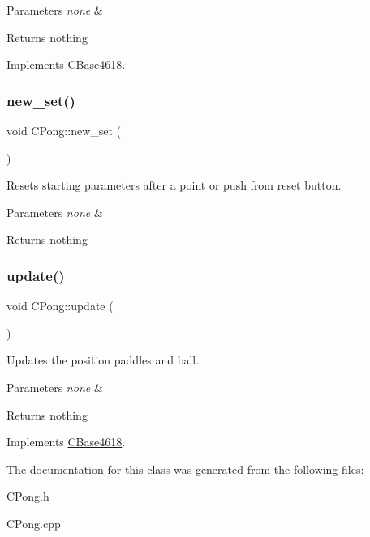 \begin{DoxyParams}{Parameters}
{\em none} & \\
\hline
\end{DoxyParams}
\begin{DoxyReturn}{Returns}
nothing 
\end{DoxyReturn}


Implements \hyperlink{class_c_base4618_a0987bf28e9beed4753d3628fcddc3315}{C\+Base4618}.

\hypertarget{class_c_pong_ab089f6ea43ba4fcfcea0a283606d5cff}{}\label{class_c_pong_ab089f6ea43ba4fcfcea0a283606d5cff} 
\subsubsection{\texorpdfstring{new\+\_\+set()}{new\_set()}}
{\footnotesize\ttfamily void C\+Pong\+::new\+\_\+set (\begin{DoxyParamCaption}{ }\end{DoxyParamCaption})\hspace{0.3cm}{\ttfamily [private]}}



Resets starting parameters after a point or push from reset button. 


\begin{DoxyParams}{Parameters}
{\em none} & \\
\hline
\end{DoxyParams}
\begin{DoxyReturn}{Returns}
nothing 
\end{DoxyReturn}
\hypertarget{class_c_pong_abdf0d44329b40d14863ba134b031435a}{}\label{class_c_pong_abdf0d44329b40d14863ba134b031435a} 
\subsubsection{\texorpdfstring{update()}{update()}}
{\footnotesize\ttfamily void C\+Pong\+::update (\begin{DoxyParamCaption}{ }\end{DoxyParamCaption})\hspace{0.3cm}{\ttfamily [virtual]}}



Updates the position paddles and ball. 


\begin{DoxyParams}{Parameters}
{\em none} & \\
\hline
\end{DoxyParams}
\begin{DoxyReturn}{Returns}
nothing 
\end{DoxyReturn}


Implements \hyperlink{class_c_base4618_a1e2f3c16eb99b5bfdd5d5254aee39ee6}{C\+Base4618}.



The documentation for this class was generated from the following files\+:\begin{DoxyCompactItemize}
\item 
C\+Pong.\+h\item 
C\+Pong.\+cpp\end{DoxyCompactItemize}
